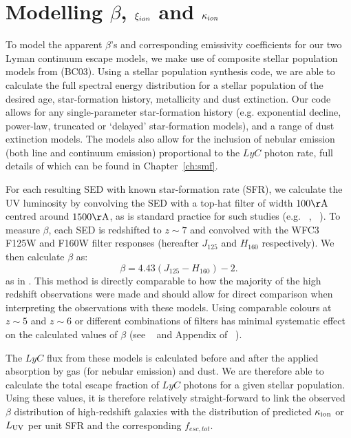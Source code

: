 \section{Modelling $\beta$, $\xi_{\lowercase{ion}}$ and $\kappa_{\lowercase{ion}}$} \label{reion-sec:models}
To model the apparent $\beta$'s and corresponding emissivity coefficients for our two Lyman continuum escape models, we make use of composite stellar population models from \citet{Bruzual:2003ckb} (BC03). Using a stellar population synthesis code, we are able to calculate the full spectral energy distribution for a stellar population of the desired age, star-formation history, metallicity and dust extinction. Our code allows for any single-parameter star-formation history (e.g. exponential decline, power-law, truncated or `delayed' star-formation models), and a range of dust extinction models. The models also allow for the inclusion of nebular emission (both line and continuum emission) proportional to the $LyC$ photon rate, full details of which can be found in Chapter~\ref{ch:smf}.

For each resulting SED with known star-formation rate (SFR), we calculate the UV luminosity by convolving the SED with a top-hat filter of width $100\rm{\AA}$ centred around $1500\rm{\AA}$, as is standard practice for such studies (e.g. \citeauthor{Finkelstein:2012hr}~\citeyear{Finkelstein:2012hr}, \citeauthor{McLure:2013hh}~\citeyear{McLure:2013hh}). To measure \(\beta \), each SED is redshifted to \(z \sim 7 \) and convolved with the WFC3 F125W and F160W filter responses (hereafter \(J_{125} \) and \(H_{160}\) respectively). We then calculate \( \beta \) as: 
\begin{equation}\label{eq:beta_calc}
    \beta = 4.43(J_{125} - H_{160}) - 2. 
\end{equation}
as in \citet{Dunlop:2013kp}. This method is directly comparable to how the majority of the high redshift observations were made and should allow for direct comparison when interpreting the observations with these models. Using comparable colours at $z\sim5$ and $z\sim6$ or different combinations of filters has minimal systematic effect on the calculated values of $\beta$ (see \citeauthor{Dunlop:2011jl}~\citeyear{Dunlop:2011jl} and Appendix of \citet{}\citeauthor{2012ApJ...754...83B}~\citeyear{2012ApJ...754...83B}).

The $LyC$ flux from these models is calculated before and after the applied absorption by gas (for nebular emission) and dust. We are therefore able to calculate the total escape fraction of $LyC$ photons for a given stellar population. Using these values, it is therefore relatively straight-forward to link the observed $\beta$ distribution of high-redshift galaxies with the distribution of predicted $\kappa_{\rm{ion}}$ or $L_{\rm{UV}}$ per unit SFR and the corresponding $f_{esc,tot}$.

